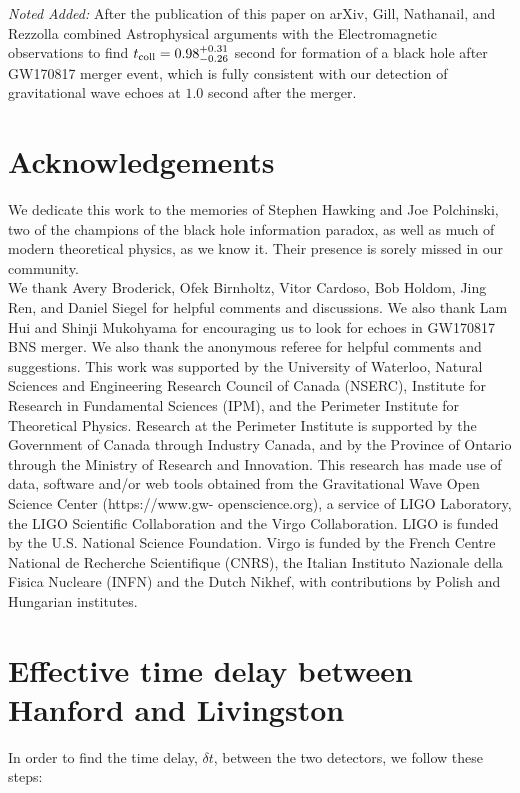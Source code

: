 \documentclass[12pt]{article}
\begin{document}
{\it Noted Added:} After the publication of this paper on arXiv, Gill, Nathanail, and Rezzolla \cite{Gill:2019bvq} combined Astrophysical arguments with the Electromagnetic observations to find $t_{\rm coll}=0.98^{+0.31}_{-0.26}$ second for formation of a black hole after GW170817 merger event, which is fully consistent with our detection of gravitational wave echoes at $1.0$ second after the merger. 

\section{Acknowledgements}

We dedicate this work to the memories of Stephen Hawking and Joe Polchinski, two of the champions of the black hole information paradox, as well as much of  modern theoretical physics, as we know it. Their presence is sorely missed in our community. 
\\

We thank Avery Broderick,  Ofek Birnholtz, Vitor Cardoso, Bob Holdom, Jing Ren, and Daniel Siegel for helpful comments and discussions. We also thank Lam Hui and Shinji Mukohyama for encouraging us to look for echoes in GW170817 BNS merger. We also thank the anonymous referee for helpful comments and suggestions. This work was supported by the University of Waterloo, Natural Sciences and Engineering Research Council of Canada (NSERC), Institute for Research in Fundamental Sciences (IPM), and the Perimeter Institute for Theoretical Physics. Research at the Perimeter Institute is supported by the Government of Canada through Industry Canada, and by the Province of Ontario through the Ministry of Research and Innovation. This research has made use of data, software and/or web tools obtained from the Gravitational Wave Open Science Center (https://www.gw- openscience.org), a service of LIGO Laboratory, the LIGO Scientific Collaboration and the Virgo Collaboration. LIGO is funded by the U.S. National Science Foundation. Virgo is funded by the French Centre National de Recherche Scientifique (CNRS), the Italian Instituto Nazionale della Fisica Nucleare (INFN) and the Dutch Nikhef, with contributions by Polish and Hungarian institutes.




\appendix
\section{Effective time delay between Hanford and Livingston}\label{delta_t}
In order to find the time delay, $\delta t$, between the two detectors, we follow these steps:
\end{document}
